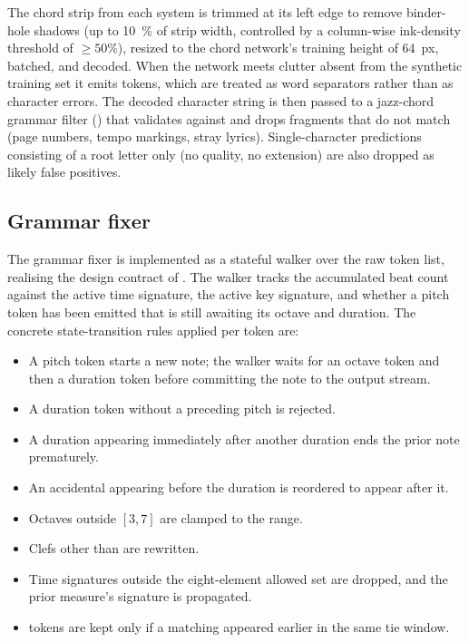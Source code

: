 The chord strip from each system is trimmed at its left edge to
remove binder-hole shadows (up to \SI{10}{\percent} of strip width,
controlled by a column-wise ink-density threshold of $\geq 50\%$),
resized to the chord network's training height of \SI{64}{px},
batched, and decoded.
When the network meets clutter absent from the synthetic training set it
emits  tokens, which are treated as word separators rather
than as character errors.
The decoded character string is then passed to a jazz-chord grammar
filter () that validates
against  and drops
fragments that do not match (page numbers, tempo markings, stray
lyrics).
Single-character predictions consisting of a root letter only
(no quality, no extension) are also dropped as likely false
positives.

\subsection{Grammar fixer}

The grammar fixer is implemented as a stateful walker over the raw
token list, realising the design contract of .
The walker tracks the accumulated beat count against the active time
signature, the active key signature, and whether a pitch token has
been emitted that is still awaiting its octave and duration.
The concrete state-transition rules applied per token are:

\begin{itemize}
    \item A pitch token starts a new note; the walker waits for an
          octave token and then a duration token before committing
          the note to the output stream.
    \item A duration token without a preceding pitch is rejected.
    \item A duration appearing immediately after another duration
          ends the prior note prematurely.
    \item An accidental appearing before the duration is reordered to
          appear after it.
    \item Octaves outside $[3, 7]$ are clamped to the range.
    \item Clefs other than  are rewritten.
    \item Time signatures outside the eight-element allowed set are
          dropped, and the prior measure's signature is propagated.
    \item {} tokens are kept only if a matching
           appeared earlier in the same tie window.
\end{itemize}

